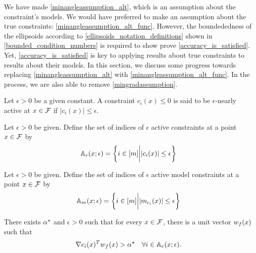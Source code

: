 We have made \cref{minangleassumption_alt}, which is an assumption about the constraint's models.
We would have preferred to make an assumption about the true constraints: \cref{minangleassumption_alt_func}.
However, the boundededness of the ellipsoids according to \cref{ellipsoids_notation_definitions} shown in \cref{bounded_condition_numbers}
is required to show prove \cref{accuracy_is_satisfied}.
Yet, \cref{accuracy_is_satisfied} is key to applying results about true constraints to results about their models.
In this section, we discuss some progress towards replacing \cref{minangleassumption_alt} with \cref{minangleassumption_alt_func}.
In the process, we are also able to remove \cref{mingradassumption}.






\begin{definition}
Let $\epsilon > 0$ be a given constant.
A constraint $c_i(x) \le 0$ is said to be $\epsilon$-nearly active at $x \in {\mathcal F}$ if $|c_i(x)| \le \epsilon$.
\end{definition}

\begin{definition}
Let $\epsilon > 0$ be given.
Define the set of indices of $\epsilon$ active constraints at a point $x \in {\mathcal F}$ by
\begin{align}
{\mathbb A_c}(x; \epsilon) = \bigg\{ i \in [m] \bigg | |c_i(x)| \le \epsilon \bigg\} \label{define_epsactive}
\end{align}
\end{definition}

\begin{definition}
Let $\epsilon > 0$ be given.
Define the set of indices of $\epsilon$ active model constraints at a point $x \in {\mathcal F}$ by
\begin{align}
{\mathbb A_{m}}(x; \epsilon) = \bigg\{ i \in [m] \bigg | |m_{c_i}(x)| \le \epsilon  \bigg\} \label{define_epsactivemodels}
\end{align}
\end{definition}

\begin{assumption}
\label{minangleassumption_alt_func}
There exists ${ \alpha^{\star} }$ and $\epsilon > 0$ such that for every $x \in {\mathcal F}$, 
there is a unit vector ${w_f}(x)$ such that
\begin{align*}
\nabla c_i(x)^T{w_f}(x) > { \alpha^{\star} }\quad \forall i \in {\mathbb A_c}(x; \epsilon).
\end{align*}
\end{assumption}


